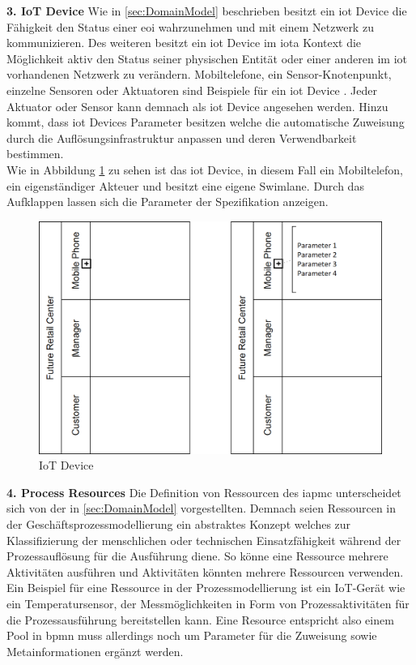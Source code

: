 \documentclass[a4paper, 12pt, twoside, headsepline=true]{scrartcl} %
\begin{document}
\textbf{3. IoT Device}
\newline
Wie in \ref{sec:DomainModel} beschrieben besitzt ein \ac{iot} Device die Fähigkeit den Status einer \ac{eoi} wahrzunehmen und mit einem Netzwerk zu kommunizieren. Des weiteren besitzt ein \ac{iot} Device im \ac{iota} Kontext die Möglichkeit aktiv den Status seiner physischen Entität oder einer anderen im \ac{iot} vorhandenen Netzwerk zu verändern. Mobiltelefone, ein Sensor-Knotenpunkt, einzelne Sensoren oder Aktuatoren sind Beispiele für ein \ac{iot} Device \cite[S.50]{conceptsiotawarepm}. Jeder Aktuator oder Sensor kann demnach als \ac{iot} Device angesehen werden. Hinzu kommt, dass \ac{iot} Devices Parameter besitzen welche die automatische Zuweisung durch die Auflösungsinfrastruktur anpassen und deren Verwendbarkeit bestimmen. \\
Wie in Abbildung \ref{fig:iotdevice} zu sehen ist das \ac{iot} Device, in diesem Fall ein Mobiltelefon, ein eigenständiger Akteuer und besitzt eine eigene Swimlane. Durch das Aufklappen lassen sich die Parameter der Spezifikation anzeigen.

\begin{figure}[H]
	\includegraphics[height=7 cm,keepaspectratio,center]{figures/IoTDevice}
	\caption{IoT Device \cite[S.53]{conceptsiotawarepm}}
	\label{fig:iotdevice}
\end{figure} 

\textbf{4. Process Resources}
\newline
Die Definition von Ressourcen des \ac{iapmc} unterscheidet sich von der in \ref{sec:DomainModel} vorgestellten. Demnach seien Ressourcen in der Geschäftsprozessmodellierung ein abstraktes Konzept welches zur Klassifizierung der menschlichen oder technischen Einsatzfähigkeit während der Prozessauflösung für die Ausführung diene. So könne eine Ressource mehrere Aktivitäten ausführen und Aktivitäten könnten mehrere Ressourcen verwenden. Ein Beispiel für eine Ressource in der Prozessmodellierung ist ein IoT-Gerät wie ein Temperatursensor, der Messmöglichkeiten in Form von Prozessaktivitäten für die Prozessausführung bereitstellen kann\cite[S.54]{conceptsiotawarepm}. Eine Resource entspricht also einem Pool in \ac{bpmn} muss allerdings noch um Parameter für die Zuweisung sowie Metainformationen ergänzt werden.
\\
\end{document}
